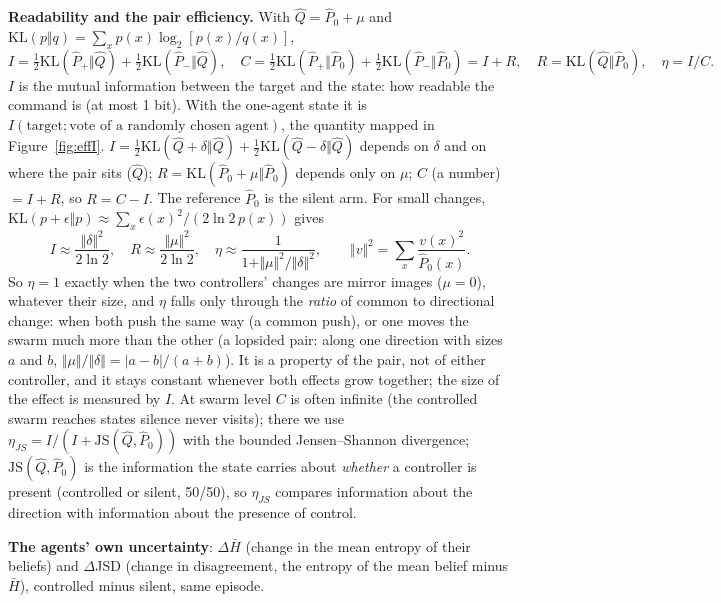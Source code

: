 \documentclass[10pt,a4paper]{article}
\begin{document}
\noindent\textbf{Readability and the pair efficiency.} With $\hat Q = \hat P_0 + \mu$ and
$\mathrm{KL}(p\Vert q) = \sum_x p(x)\log_2[p(x)/q(x)]$,
\begin{equation}\label{eq:eta}
I = \tfrac12\mathrm{KL}(\hat P_+\Vert\hat Q) + \tfrac12\mathrm{KL}(\hat P_-\Vert\hat Q),\quad
C = \tfrac12\mathrm{KL}(\hat P_+\Vert\hat P_0) + \tfrac12\mathrm{KL}(\hat P_-\Vert\hat P_0) = I + R,\quad
R = \mathrm{KL}(\hat Q\Vert\hat P_0),\quad \eta = I/C .
\end{equation}
$I$ is the mutual information between the target and the state: how readable the command is
(at most 1 bit). With the one-agent state it is $I(\text{target};\text{vote of a randomly chosen
agent})$, the quantity mapped in Figure~\ref{fig:effI}. $I = \frac12\mathrm{KL}(\hat Q+\delta\Vert\hat Q) + \frac12\mathrm{KL}(\hat Q-\delta\Vert\hat Q)$
depends on $\delta$ and on where the pair sits ($\hat Q$); $R = \mathrm{KL}(\hat P_0+\mu\Vert\hat P_0)$ depends
only on $\mu$; $C$ (a number) $= I + R$, so $R = C - I$. The reference $\hat P_0$ is the silent arm. For
small changes, $\mathrm{KL}(p+\epsilon\Vert p) \approx \sum_x \epsilon(x)^2/(2\ln 2\,p(x))$ gives
\begin{equation}\label{eq:etasmall}
I \approx \frac{\Vert\delta\Vert^2}{2\ln 2},\quad R \approx \frac{\Vert\mu\Vert^2}{2\ln 2},\quad
\eta \approx \frac{1}{1 + \Vert \mu\Vert^2/\Vert\delta\Vert^2},\qquad \Vert v\Vert^2 = \sum_x \frac{v(x)^2}{\hat P_0(x)} .
\end{equation}
So $\eta = 1$ exactly when the two controllers' changes are mirror images ($\mu = 0$), whatever their
size, and $\eta$ falls only through the \emph{ratio} of common to directional change: when both push
the same way (a common push), or one moves the swarm much more than the other (a lopsided pair:
along one direction with sizes $a$ and $b$, $\Vert \mu\Vert/\Vert\delta\Vert = |a-b|/(a+b)$). It is a
property of the pair, not of either controller, and it stays constant whenever both effects grow
together; the size of the effect is measured by $I$. At swarm level $C$ is often infinite (the
controlled swarm reaches states silence never visits); there we use $\eta_{JS} = I/(I + \mathrm{JS}(\hat Q,\hat P_0))$ with the bounded
Jensen--Shannon divergence; $\mathrm{JS}(\hat Q,\hat P_0)$ is the information the state carries about
\emph{whether} a controller is present (controlled or silent, 50/50), so $\eta_{JS}$ compares
information about the direction with information about the presence of control.

\noindent\textbf{The agents' own uncertainty}: $\Delta\bar H$ (change in the mean entropy of their
beliefs) and $\Delta$JSD (change in disagreement, the entropy of the mean belief minus $\bar H$),
controlled minus silent, same episode.
\end{document}
